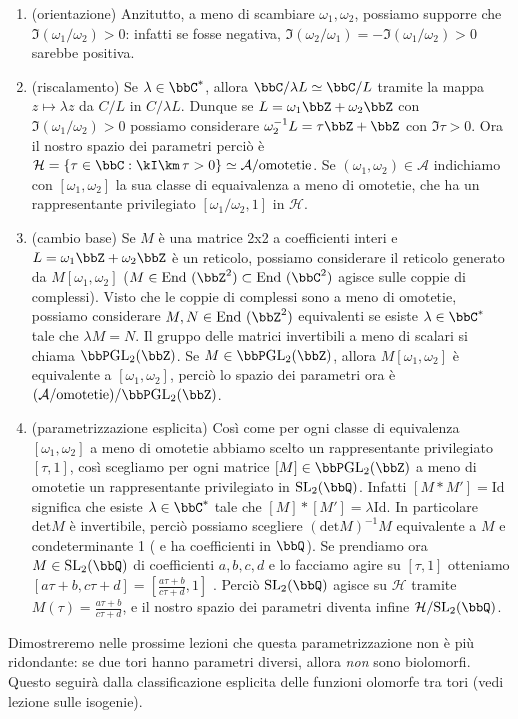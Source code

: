 \begin{enumerate}
\item (orientazione) Anzitutto, a meno di scambiare $\omega_1, \omega_2$, possiamo supporre che $\Im(\omega_1/\omega_2) > 0$: infatti se fosse negativa, $\Im(\omega_2/\omega_1) = -\Im(\omega_1/\omega_2)  > 0$ sarebbe positiva.
\item (riscalamento) Se $\lambda \in \bbC^*$, allora $\bbC/\lambda L  \simeq \bbC/L$ tramite la mappa $z \mapsto \lambda z$ da $C/L$ in $C/\lambda L$. Dunque se $L= \omega_1\bbZ + \omega_2 \bbZ$ con $\Im(\omega_1/\omega_2) > 0$ possiamo considerare $\omega_2^{-1}L= \tau \bbZ + \bbZ $ con $\Im \tau > 0$. Ora il nostro spazio dei parametri perciò è $\mathcal{H} = \{ \tau \in \bbC: \Im \tau > 0 \} \simeq \mathcal{A} / \text{omotetie}$. Se $(\omega_1, \omega_2) \in \mathcal{A}$ indichiamo con $[\omega_1, \omega_2]$ la sua classe di equaivalenza a meno di omotetie, che ha un rappresentante privilegiato $[\omega_1/\omega_2, 1]$ in $\mathcal{H}$.
\item (cambio base) Se $M$ è una matrice 2x2 a coefficienti interi e $L=\omega_1\bbZ + \omega_2\bbZ$ è un reticolo, possiamo considerare il reticolo generato da $M[\omega_1, \omega_2]$ ($M \in \End(\bbZ^2) \subset \End(\bbC^2)$ agisce sulle coppie di complessi). Visto che le coppie di complessi sono a meno di omotetie, possiamo considerare $M,N \in \End(\bbZ^2)$ equivalenti se esiste $\lambda \in \bbC^*$ tale che $\lambda M = N$. Il gruppo delle matrici invertibili a meno di scalari si chiama $\bbP \GL_2(\bbZ)$.  Se $M \in \bbP \GL_2(\bbZ)$, allora $M[\omega_1,\omega_2]$ è equivalente a $[\omega_1,\omega_2]$, perciò lo spazio dei parametri ora è $(\mathcal{A}/\text{omotetie})/\bbP \GL_2(\bbZ)$.
\item (parametrizzazione esplicita) Così come per ogni classe di equivalenza $[\omega_1, \omega_2]$ a meno di omotetie abbiamo scelto un rappresentante privilegiato $[\tau,1]$, così scegliamo per ogni matrice $[M] \in \bbP \GL_2(\bbZ)$ a meno di omotetie un rappresentante privilegiato in $\SL_2(\bbQ)$. Infatti $[M*M'] = \mathrm{ Id} $ significa che esiste $\lambda \in \bbC^*$ tale che
$[M]*[M'] = \lambda \mathrm{Id} $. In particolare $\mathrm{det } M$ è invertibile, perciò possiamo scegliere $(\mathrm{det }M)^{-1}M$ equivalente a $M$ e condeterminante 1 ( e ha coefficienti in $\bbQ$). Se prendiamo ora $M \in \SL_2(\bbQ)$ di coefficienti $a,b,c,d$ e lo facciamo agire su $[\tau,1]$ otteniamo $\displaystyle [a\tau+b,c\tau+d]= \left [ \frac{a\tau+b}{c \tau + d}, 1 \right ] $ . Perciò $\SL_2(\bbQ)$ agisce su $\mathcal{H}$ tramite $ M( \tau) = \frac{a \tau+b}{c\tau+d} $, e il nostro spazio dei parametri diventa infine $\mathcal{H} / \SL_2(\bbQ)$.
\end{enumerate}

Dimostreremo nelle prossime lezioni che questa parametrizzazione non è più ridondante: se due tori hanno parametri diversi, allora \textit{non} sono biolomorfi. Questo seguirà dalla classificazione esplicita delle funzioni olomorfe tra tori (vedi lezione sulle isogenie).
